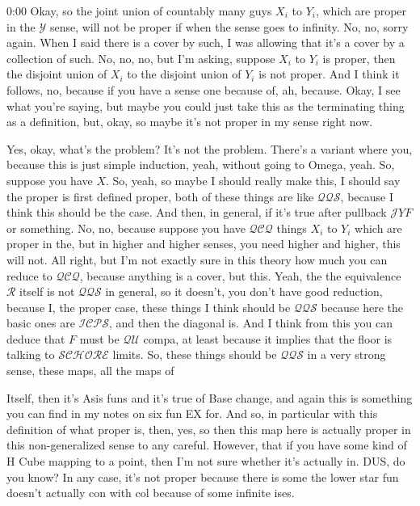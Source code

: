 \begin{unfinished}{0:00}
Okay, so the joint union of countably many guys $X_i$ to $Y_i$, which are proper in the $\mathcal{Y}$ sense, will not be proper if when the sense goes to infinity. No, no, sorry again. When I said there is a cover by such, I was allowing that it's a cover by a collection of such. No, no, no, but I'm asking, suppose $X_i$ to $Y_i$ is proper, then the disjoint union of $X_i$ to the disjoint union of $Y_i$ is not proper. And I think it follows, no, because if you have a sense one because of, ah, because. Okay, I see what you're saying, but maybe you could just take this as the terminating thing as a definition, but, okay, so maybe it's not proper in my sense right now.

Yes, okay, what's the problem? It's not the problem. There's a variant where you, because this is just simple induction, yeah, without going to Omega, yeah. So, suppose you have $X$. So, yeah, so maybe I should really make this, I should say the proper is first defined proper, both of these things are like $\mathcal{QQS}$, because I think this should be the case. And then, in general, if it's true after pullback $\mathcal{J}Y F$ or something. No, no, because suppose you have $\mathcal{QCQ}$ things $X_i$ to $Y_i$ which are proper in the, but in higher and higher senses, you need higher and higher, this will not. All right, but I'm not exactly sure in this theory how much you can reduce to $\mathcal{QCQ}$, because anything is a cover, but this. Yeah, the the equivalence $\mathcal{R}$ itself is not $\mathcal{QQS}$ in general, so it doesn't, you don't have good reduction, because I, the proper case, these things I think should be $\mathcal{QQS}$ because here the basic ones are $\mathcal{I CPS}$, and then the diagonal is. And I think from this you can deduce that $F$ must be $\mathcal{QU}$ compa, at least because it implies that the floor is talking to $\mathcal{SCHORE}$ limits. So, these things should be $\mathcal{QQS}$ in a very strong sense, these maps, all the maps of 

Itself, then it's Asis funs and it's true of Base change, and again this is something you can find in my notes on six fun EX for. And so, in particular with this definition of what proper is, then, yes, so then this map here is actually proper in this non-generalized sense to any careful. However, that if you have some kind of H Cube mapping to a point, then I'm not sure whether it's actually in. DUS, do you know? In any case, it's not proper because there is some the lower star fun doesn't actually con with col because of some infinite ises.


\end{unfinished}
